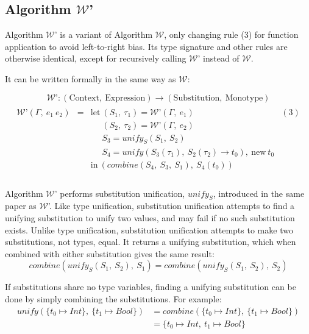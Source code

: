 \documentclass[a4paper,fleqn,oneside,12pt]{report}
\newcommand{\W}{$\mathcal{W}$}
\begin{document}
\subsection{Algorithm \texorpdfstring{\W}{W}'}

Algorithm \W’ is a variant of Algorithm \W, only changing rule (3) for function application to avoid left-to-right bias. Its type signature and other rules are otherwise identical, except for recursively calling \W' instead of \W.

It can be written formally in the same way as \W:

$$
\mathcal{W}\textrm{'}: (\mathrm{Context},\ \mathrm{Expression}) \rightarrow (\mathrm{Substitution},\ \mathrm{Monotype})
$$$$
\begin{array}{lclc}
  \\
    \mathcal{W}\textrm{'}(\Gamma,\ e_1\ e_2) & = & \textrm{let}\ (S_1,\ \tau_1) = \mathcal{W}\textrm{'}(\Gamma,\ e_1) & (3)\\
                                             &   & \phantom{\textrm{let}}\ (S_2,\ \tau_2) = \mathcal{W}\textrm{'}(\Gamma,\ e_2) &\\
                                             &   & \phantom{\textrm{let}}\ S_3 = \mathit{unify_S}(S_1,\ S_2) &\\
                                             &   & \phantom{\textrm{let}}\ S_4 = \mathit{unify}(S_3(\tau_1),\ S_2(\tau_2) \rightarrow t_0),\ \textrm{new}\ t_0 &\\
                                             &   & \textrm{in}\ (\mathit{combine}(S_4,\ S_3,\ S_1),\ S_4(t_0)) &\\
  \\
\end{array}
$$

Algorithm \W' performs substitution unification, $\mathit{unify_S}$, introduced in the same paper as \W'. Like type unification, substitution unification attempts to find a unifying substitution to unify two values, and may fail if no such substitution exists. Unlike type unification, substitution unification attempts to make two substitutions, not types, equal. It returns a unifying substitution, which when combined with either substitution gives the same result:
$$\mathit{combine}(\mathit{unify_S}(S_1,\ S_2),\ S_1) = \mathit{combine}(\mathit{unify_S}(S_1,\ S_2),\ S_2)$$

If substitutions share no type variables, finding a unifying substitution can be done by simply combining the substitutions. For example:
\begin{align*}
  \mathit{unify}(\{ t_0 \mapsto Int \},\ \{ t_1 \mapsto Bool \}) & = \mathit{combine}(\{ t_0 \mapsto Int \},\ \{ t_1 \mapsto Bool \})\\
                                                                 & = \{ t_0 \mapsto Int,\ t_1 \mapsto Bool \}
\end{align*}
\end{document}
